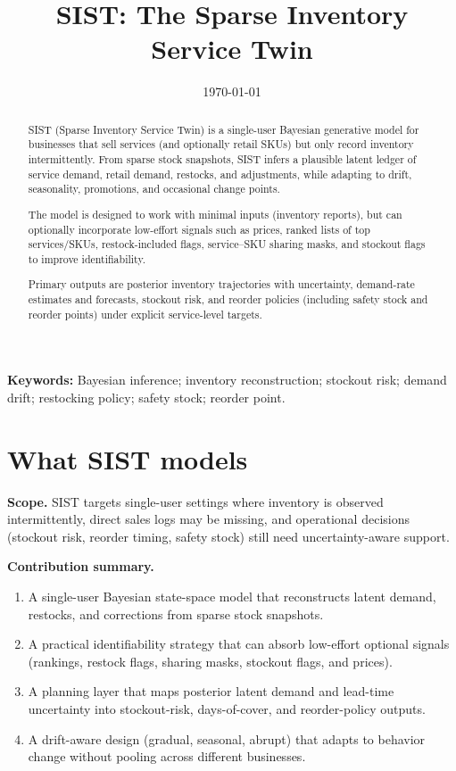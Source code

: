 \documentclass[11pt]{article}
\title{SIST: The Sparse Inventory Service Twin}
\author{}
\date{\today}
\begin{document}
\begin{titlepage}
\maketitle

\begin{abstract}
SIST (Sparse Inventory Service Twin) is a single-user Bayesian generative model for businesses that sell services (and optionally retail SKUs) but only record inventory intermittently. From sparse stock snapshots, SIST infers a plausible latent ledger of service demand, retail demand, restocks, and adjustments, while adapting to drift, seasonality, promotions, and occasional change points.

The model is designed to work with minimal inputs (inventory reports), but can optionally incorporate low-effort signals such as prices, ranked lists of top services/SKUs, restock-included flags, service--SKU sharing masks, and stockout flags to improve identifiability.

Primary outputs are posterior inventory trajectories with uncertainty, demand-rate estimates and forecasts, stockout risk, and reorder policies (including safety stock and reorder points) under explicit service-level targets.
\end{abstract}

\vspace{1em}
\noindent\textbf{Keywords:} Bayesian inference; inventory reconstruction; stockout risk; demand drift; restocking policy; safety stock; reorder point.

\end{titlepage}

\tableofcontents
\newpage

\section{What SIST models}

\textbf{Scope.} SIST targets single-user settings where inventory is observed intermittently, direct sales logs may be missing, and operational decisions (stockout risk, reorder timing, safety stock) still need uncertainty-aware support.

\textbf{Contribution summary.}
\begin{enumerate}
  \item A single-user Bayesian state-space model that reconstructs latent demand, restocks, and corrections from sparse stock snapshots.
  \item A practical identifiability strategy that can absorb low-effort optional signals (rankings, restock flags, sharing masks, stockout flags, and prices).
  \item A planning layer that maps posterior latent demand and lead-time uncertainty into stockout-risk, days-of-cover, and reorder-policy outputs.
  \item A drift-aware design (gradual, seasonal, abrupt) that adapts to behavior change without pooling across different businesses.
\end{enumerate}
\end{document}

